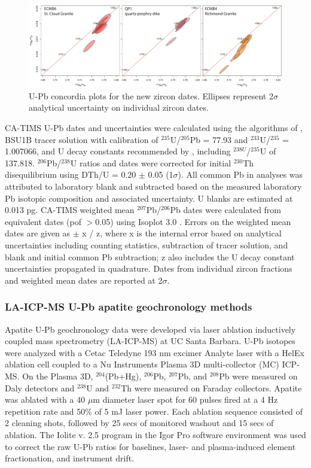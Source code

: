 \documentclass[11pt,letterpaper]{article}
\begin{document}
\begin{figure}[!ht]
\noindent\includegraphics[width=\textwidth]{./figures/SI_zircon_concordia.pdf}
\centering
\caption{\small{U-Pb concordia plots for the new zircon dates. Ellipses represent  2$\sigma$ analytical uncertainty on individual zircon dates.}}
\label{fig:zircon_concordia}
\end{figure}

CA-TIMS U-Pb dates and uncertainties were calculated using the algorithms of \cite{Schmitz2007b}, BSU1B tracer solution with calibration of $^{235}$U/$^{205}$Pb = 77.93 and $^{233}$U/$^{235}$ = 1.007066, and U decay constants recommended by \cite{Hiess2012a}, including $^{238U}$/$^{235}$U of 137.818. $^{206}$Pb/$^{238}$U ratios and dates were corrected for initial $^{230}$Th disequilibrium using DTh/U = 0.20 $\pm$ 0.05 (1$\sigma$). All common Pb in analyses was attributed to laboratory blank and subtracted based on the measured laboratory Pb isotopic composition and associated uncertainty. U blanks are estimated at 0.013 pg. CA-TIMS weighted mean $^{207}$Pb/$^{206}$Pb dates were calculated from equivalent dates (pof $>$0.05) using Isoplot 3.0 \citep{Ludwig2003a}. Errors on the weighted mean dates are given as $\pm$ x / z, where x is the internal error based on analytical uncertainties including counting statistics, subtraction of tracer solution, and blank and initial common Pb subtraction; z also includes the U decay constant uncertainties propagated in quadrature. Dates from individual zircon fractions and weighted mean dates are reported at 2$\sigma$.

\subsubsection*{LA-ICP-MS U-Pb apatite geochronology methods}

Apatite U-Pb geochronology data were developed via laser ablation inductively coupled mass spectrometry (LA-ICP-MS) at UC Santa Barbara. U-Pb isotopes were analyzed with a Cetac Teledyne 193 nm excimer Analyte laser with a HelEx ablation cell coupled to a Nu Instruments Plasma 3D multi-collector (MC) ICP-MS. On the Plasma 3D, $^{204}$(Pb+Hg), $^{206}$Pb, $^{207}$Pb, and $^{208}$Pb were measured on Daly detectors and $^{238}$U and $^{232}$Th were measured on Faraday collectors. Apatite was ablated with a 40 $\mu$m diameter laser spot for 60 pulses fired at a 4 Hz repetition rate and 50$\%$ of 5 mJ laser power. Each ablation sequence consisted of 2 cleaning shots, followed by 25 secs of monitored washout and 15 secs of ablation. The Iolite v. 2.5 program \citep{Paton2011a} in the Igor Pro software environment was used to correct the raw U-Pb ratios for baselines, laser- and plasma-induced element fractionation, and instrument drift.
\end{document}
